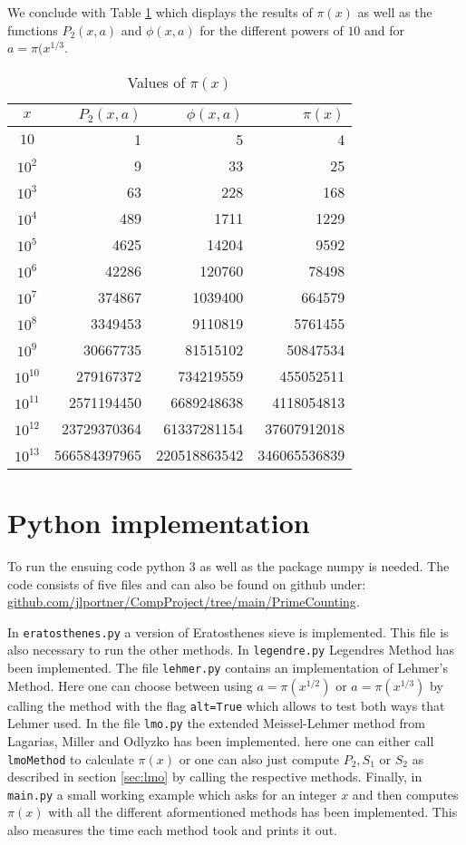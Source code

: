 We conclude with Table \ref{tab:computations} which displays the results of $\pi(x)$ as well as the functions $P_2(x,a)$ and $\phi(x,a)$ 
for the different powers of $10$ and for $a = \pi(x^{1 / 3}$.

\begin{table}[htpb]
	\centering
	\label{tab:computations}
	\begin{tabular}{|c|r|r|r|}
		\hline
		$x$ & $P_2(x,a)$ & $\phi(x,a)$ & $\pi(x)$\\ \hline
        $10$ & 1 & 5 & 4\\
        $10^2$ & 9 & 33 & 25\\
        $10^3$ & 63 & 228 & 168\\
        $10^4$ & 489 & 1711 & 1229\\
        $10^5$ & 4625 & 14204 & 9592\\
        $10^6$ & 42286 & 120760 & 78498\\
        $10^7$ & 374867 & 1039400 & 664579\\
        $10^8$ & 3349453 & 9110819 & 5761455\\
		$10^{9}$ & 30667735 & 81515102 & 50847534\\
		$10^{10}$ & 279167372 & 734219559 & 455052511\\
        $10^{11}$ & 2571194450 & 6689248638 & 4118054813\\
        $10^{12}$ & 23729370364 & 61337281154 & 37607912018\\
        $10^{13}$ & 566584397965 & 220518863542 & 346065536839\\ \hline
        
	\end{tabular}
	\caption{Values of $\pi(x)$}
\end{table}


\newpage
\printbibliography
\newpage
\appendix
\section{Python implementation}
To run the ensuing code python 3 as well as the package numpy is needed.
The code consists of five files and can also be found on github under: \url{github.com/jlportner/CompProject/tree/main/PrimeCounting}.

In \texttt{eratosthenes.py} a version of Eratosthenes sieve is implemented. This file is also necessary to run the other methods.
In \texttt{legendre.py} Legendres Method has been implemented. 
The file \texttt{lehmer.py} contains an implementation of Lehmer's Method. Here one can choose
between using $a = \pi(x^{1 /2})$ or $a = \pi(x^{1 /3})$ by calling the method with the flag \texttt{alt=True}
which allows to test both ways that Lehmer used.
In the file \texttt{lmo.py} the extended Meissel-Lehmer method from Lagarias, Miller and Odlyzko has been implemented. 
here one can either call \texttt{lmoMethod} to calculate $\pi(x)$ or one can also 
just compute $P_2, S_1$ or $S_2$ as described in section \ref{sec:lmo} by calling the respective methods.
Finally, in \texttt{main.py} a small working example which asks for an integer $x$ and then computes $\pi(x)$ with all the different aformentioned methods 
has been implemented. This also measures the time each method took and prints it out.

